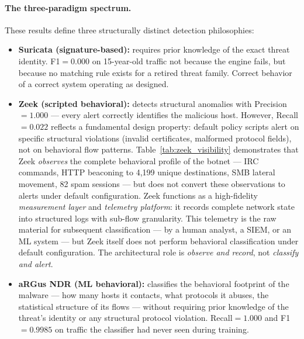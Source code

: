 \documentclass[11pt,a4paper]{article}
\begin{document}
    \paragraph{The three-paradigm spectrum.}
    These results define three structurally distinct detection philosophies:

    \begin{itemize}[noitemsep]
        \item \textbf{Suricata (signature-based):} requires prior knowledge of the
        exact threat identity. F1$=0.000$ on 15-year-old traffic not because the engine
        fails, but because no matching rule exists for a retired threat family. Correct
        behavior of a correct system operating as designed.

        \item \textbf{Zeek (scripted behavioral):} detects structural anomalies with
        Precision$=1.000$ --- every alert correctly identifies the malicious host.
        However, Recall$=0.022$ reflects a fundamental design property: default
        policy scripts alert on specific structural violations (invalid certificates,
        malformed protocol fields), not on behavioral flow patterns. Table~\ref{tab:zeek_visibility}
        demonstrates that Zeek \emph{observes} the complete behavioral profile of the
        botnet --- IRC commands, HTTP beaconing to 4,199 unique destinations, SMB
        lateral movement, 82 spam sessions --- but does not convert these observations
        to alerts under default configuration.
        Zeek functions as a high-fidelity \emph{measurement layer} and \emph{telemetry
        platform}: it records complete network state into structured logs with
        sub-flow granularity. This telemetry is the raw material for subsequent
        classification --- by a human analyst, a SIEM, or an ML system --- but
        Zeek itself does not perform behavioral classification under default
        configuration. The architectural role is \emph{observe and record},
        not \emph{classify and alert}.

        \item \textbf{aRGus NDR (ML behavioral):} classifies the behavioral footprint
        of the malware --- how many hosts it contacts, what protocols it abuses, the
        statistical structure of its flows --- without requiring prior knowledge of the
        threat's identity or any structural protocol violation. Recall$=1.000$ and
        F1$=0.9985$ on traffic the classifier had never seen during training.
    \end{itemize}
\end{document}
